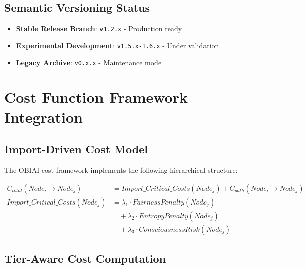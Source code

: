 \documentclass[11pt,letterpaper]{article}
\newcommand{\semiver}[1]{\texttt{v#1}}
\begin{document}
\subsection{Semantic Versioning Status}
\begin{itemize}
    \item \textbf{Stable Release Branch}: \semiver{1.2.x} - Production ready
    \item \textbf{Experimental Development}: \semiver{1.5.x-1.6.x} - Under validation
    \item \textbf{Legacy Archive}: \semiver{0.x.x} - Maintenance mode
\end{itemize}

\section{Cost Function Framework Integration}
\label{sec:cost_framework}

\subsection{Import-Driven Cost Model}

The OBIAI cost framework implements the following hierarchical structure:

\begin{align}
C_{total}(Node_i \rightarrow Node_j) &= Import\_Critical\_Costs(Node_j) + C_{path}(Node_i \rightarrow Node_j) \\
Import\_Critical\_Costs(Node_j) &= \lambda_1 \cdot FairnessPenalty(Node_j) \\
&\quad + \lambda_2 \cdot EntropyPenalty(Node_j) \\
&\quad + \lambda_3 \cdot ConsciousnessRisk(Node_j)
\end{align}

\subsection{Tier-Aware Cost Computation}
\end{document}
